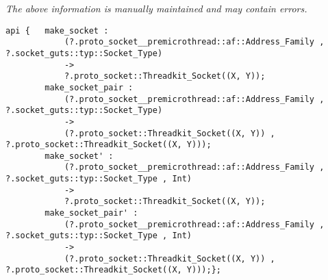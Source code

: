 \label{api:Plain\_Socket}

{\tiny \it The above information is manually maintained and may contain errors.}
\begin{verbatim}
api {   make_socket :
            (?.proto_socket__premicrothread::af::Address_Family , ?.socket_guts::typ::Socket_Type)
            ->
            ?.proto_socket::Threadkit_Socket((X, Y));
        make_socket_pair :
            (?.proto_socket__premicrothread::af::Address_Family , ?.socket_guts::typ::Socket_Type)
            ->
            (?.proto_socket::Threadkit_Socket((X, Y)) , ?.proto_socket::Threadkit_Socket((X, Y)));
        make_socket' :
            (?.proto_socket__premicrothread::af::Address_Family , ?.socket_guts::typ::Socket_Type , Int)
            ->
            ?.proto_socket::Threadkit_Socket((X, Y));
        make_socket_pair' :
            (?.proto_socket__premicrothread::af::Address_Family , ?.socket_guts::typ::Socket_Type , Int)
            ->
            (?.proto_socket::Threadkit_Socket((X, Y)) , ?.proto_socket::Threadkit_Socket((X, Y)));};
\end{verbatim}
